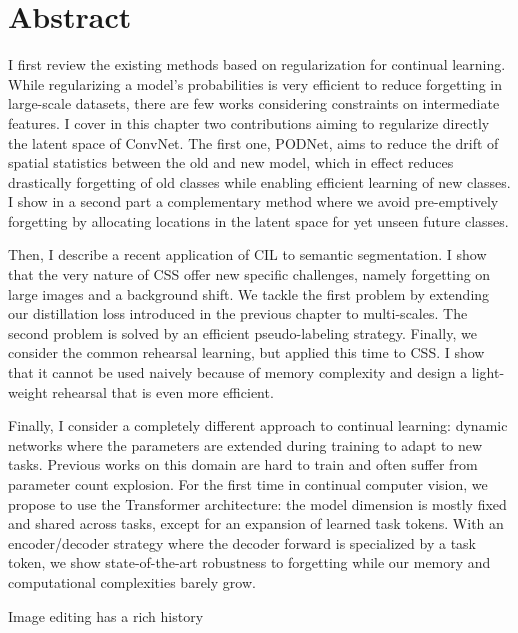 \cleardoublepage
\setcounter{page}{1}

\chapter{Abstract}

I first review the existing methods based on regularization for continual learning. While
regularizing a model's probabilities is very efficient to reduce forgetting in large-scale datasets,
there are few works considering constraints on intermediate features. I cover in this chapter two
contributions aiming to regularize directly the latent space of \acs{ConvNet}. The first one,
PODNet, aims to reduce the drift of spatial statistics between the old and new model, which in
effect reduces drastically forgetting of old classes while enabling efficient learning of new
classes. I show in a second part a complementary method where we avoid pre-emptively forgetting by
allocating locations in the latent space for yet unseen future classes.

Then, I describe a recent application of \acf{CIL} to semantic segmentation. I show that
the very nature of \acf{CSS} offer new specific challenges, namely forgetting on large
images and a background shift. We tackle the first problem by extending our distillation
loss introduced in the previous chapter to multi-scales. The second problem is solved by
an efficient pseudo-labeling strategy. Finally, we consider the common rehearsal learning,
but applied this time to \ac{CSS}. I show that it cannot be used naively because of memory
complexity and design a light-weight rehearsal that is even more efficient.

Finally, I consider a completely different approach to continual learning: dynamic networks
where the parameters are extended during training to adapt to new tasks. Previous works on
this domain are hard to train and often suffer from parameter count explosion. For the
first time in continual computer vision, we propose to use the Transformer architecture:
the model dimension is mostly fixed and shared across tasks, except for an
expansion of learned task tokens. With an encoder/decoder strategy where the decoder
forward is specialized by a task token, we show state-of-the-art robustness to forgetting
while our memory and computational complexities barely grow.



Image editing has a rich history 


\cleardoublepage


